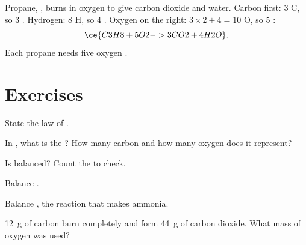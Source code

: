 \begin{example}\label{ex:g8:balanced-equations:propane}
Propane, , burns in oxygen to give carbon dioxide and water.
Carbon first: 3 C, so 3 . Hydrogen: 8 H, so 4 . Oxygen
on the right: $3 \times 2 + 4 = 10$ O, so 5 :
\[
  \ce{C3H8 + 5O2 -> 3CO2 + 4H2O}.
\]
Each propane  needs five oxygen .
\end{example}

\section{Exercises}

\begin{exercise}[$\star$]\label{exo:g8:balanced-equations:1}
State the law of .
\end{exercise}

\begin{exercise}[$\star$]\label{exo:g8:balanced-equations:2}
In , what is the ? How many carbon
 and how many oxygen  does it represent?
\end{exercise}

\begin{exercise}[$\star$]\label{exo:g8:balanced-equations:3}
Is  balanced? Count the  to check.
\end{exercise}

\begin{exercise}[$\star$]\label{exo:g8:balanced-equations:4}
Balance . %
\end{exercise}

\begin{exercise}[$\star\star$]\label{exo:g8:balanced-equations:5}
Balance , the reaction that makes ammonia. %
\end{exercise}

\begin{exercise}[$\star\star$]\label{exo:g8:balanced-equations:6}
\qty{12}{g} of carbon burn completely and form \qty{44}{g} of carbon
dioxide. What mass of oxygen was used?
\end{exercise}

